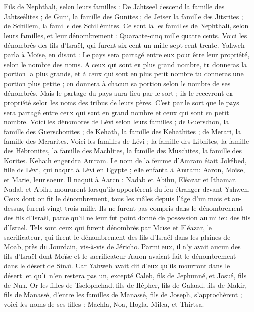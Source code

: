 \begin{multicols}{2}
Fils de Nephthali, selon leurs familles : De Jahtseel descend la famille des Jahtseélites ; de Guni, la famille des Gunites ;
de Jetser la famille des Jitsrites ; de Schillem, la famille des Schillémites.
Ce sont là les familles de Nephthali, selon leurs familles, et leur dénombrement : Quarante-cinq mille quatre cents.
Voici les dénombrés des fils d'Israël, qui furent six cent un mille sept cent trente.
Yahweh parla à Moïse, en disant :
Le pays sera partagé entre eux pour être leur propriété, selon le nombre des noms.
A ceux qui sont en plus grand nombre, tu donneras la portion la plus grande, et à ceux qui sont en plus petit nombre tu donneras une portion plus petite ; on donnera à chacun sa portion selon le nombre de ses dénombrés.
Mais le partage du pays aura lieu par le sort ; ils le recevront en propriété selon les noms des tribus de leurs pères.
C’est par le sort que le pays sera partagé entre ceux qui sont en grand nombre et ceux qui sont en petit nombre.
Voici les dénombrés de Lévi selon leurs familles ; de Guerschon, la famille des Guerschonites ; de Kehath, la famille des Kehathites ; de Merari, la famille des Merarites.
Voici les familles de Lévi ; la famille des Libnites, la famille des Hébronites, la famille des Machlites, la famille des Muschites, la famille des Korites. Kehath engendra Amram.
Le nom de la femme d’Amram était Jokébed, fille de Lévi, qui naquit à Lévi en Egypte ; elle enfanta à Amram: Aaron, Moïse, et Marie, leur soeur.
Il naquit à Aaron : Nadab et Abihu, Eléazar et Ithamar.
Nadab et Abihu moururent lorsqu’ils apportèrent du feu étranger devant Yahweh.
Ceux dont on fit le dénombrement, tous les mâles depuis l’âge d’un mois et au-dessus, furent vingt-trois mille. Ils ne furent pas compris dans le dénombrement des fils d’Israël, parce qu’il ne leur fut point donné de possession au milieu des fils d’Israël.
Tels sont ceux qui furent dénombrés par Moïse et Eléazar, le sacrificateur, qui firent le dénombrement des fils d'Israël dans les plaines de Moab, près du Jourdain, vis-à-vis de Jéricho.
Parmi eux, il n’y avait aucun des fils d’Israël dont Moïse et le sacrificateur Aaron avaient fait le dénombrement dans le désert de Sinaï.
Car Yahweh avait dit d'eux qu’ils mourront dans le désert, et qu’il n'en restera pas un, excepté Caleb, fils de Jephunné, et Josué, fils de Nun.
\VerseOne{}Or les filles de Tselophchad, fils de Hépher, fils de Galaad, fils de Makir, fils de Manassé, d'entre les familles de Manassé, fils de Joseph, s'approchèrent ; voici les noms de ses filles : Machla, Noa, Hogla, Milca, et Thirtsa.

\end{multicols}
